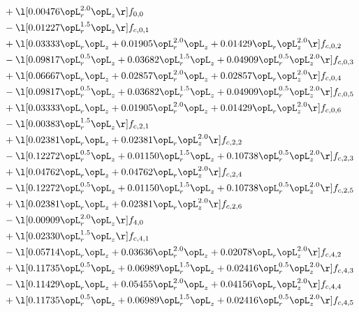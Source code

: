 \begin{alignat}{2}
& + \l[  0.00476 \opL_r^{2.0} \opL_z  \r] f_{0,0} \nonumber \\ 
& - \l[  0.01227 \opL_r^{1.5} \opL_z  \r] f_{c,0,1} \nonumber \\ 
& + \l[  0.03333 \opL_r \opL_z +  0.01905 \opL_r^{2.0} \opL_z +  0.01429 \opL_r \opL_z^{2.0}  \r] f_{c,0,2} \nonumber \\ 
& - \l[  0.09817 \opL_r^{0.5} \opL_z +  0.03682 \opL_r^{1.5} \opL_z +  0.04909 \opL_r^{0.5} \opL_z^{2.0}  \r] f_{c,0,3} \nonumber \\ 
& + \l[  0.06667 \opL_r \opL_z +  0.02857 \opL_r^{2.0} \opL_z +  0.02857 \opL_r \opL_z^{2.0}  \r] f_{c,0,4} \nonumber \\ 
& - \l[  0.09817 \opL_r^{0.5} \opL_z +  0.03682 \opL_r^{1.5} \opL_z +  0.04909 \opL_r^{0.5} \opL_z^{2.0}  \r] f_{c,0,5} \nonumber \\ 
& + \l[  0.03333 \opL_r \opL_z +  0.01905 \opL_r^{2.0} \opL_z +  0.01429 \opL_r \opL_z^{2.0}  \r] f_{c,0,6} \nonumber \\ 
& - \l[  0.00383 \opL_r^{1.5} \opL_z  \r] f_{c,2,1} \nonumber \\ 
& + \l[  0.02381 \opL_r \opL_z +  0.02381 \opL_r \opL_z^{2.0}  \r] f_{c,2,2} \nonumber \\ 
& - \l[  0.12272 \opL_r^{0.5} \opL_z +  0.01150 \opL_r^{1.5} \opL_z +  0.10738 \opL_r^{0.5} \opL_z^{2.0}  \r] f_{c,2,3} \nonumber \\ 
& + \l[  0.04762 \opL_r \opL_z +  0.04762 \opL_r \opL_z^{2.0}  \r] f_{c,2,4} \nonumber \\ 
& - \l[  0.12272 \opL_r^{0.5} \opL_z +  0.01150 \opL_r^{1.5} \opL_z +  0.10738 \opL_r^{0.5} \opL_z^{2.0}  \r] f_{c,2,5} \nonumber \\ 
& + \l[  0.02381 \opL_r \opL_z +  0.02381 \opL_r \opL_z^{2.0}  \r] f_{c,2,6} \nonumber \\ 
& - \l[  0.00909 \opL_r^{2.0} \opL_z  \r] f_{4,0} \nonumber \\ 
& + \l[  0.02330 \opL_r^{1.5} \opL_z  \r] f_{c,4,1} \nonumber \\ 
& - \l[  0.05714 \opL_r \opL_z +  0.03636 \opL_r^{2.0} \opL_z +  0.02078 \opL_r \opL_z^{2.0}  \r] f_{c,4,2} \nonumber \\ 
& + \l[  0.11735 \opL_r^{0.5} \opL_z +  0.06989 \opL_r^{1.5} \opL_z +  0.02416 \opL_r^{0.5} \opL_z^{2.0}  \r] f_{c,4,3} \nonumber \\ 
& - \l[  0.11429 \opL_r \opL_z +  0.05455 \opL_r^{2.0} \opL_z +  0.04156 \opL_r \opL_z^{2.0}  \r] f_{c,4,4} \nonumber \\ 
& + \l[  0.11735 \opL_r^{0.5} \opL_z +  0.06989 \opL_r^{1.5} \opL_z +  0.02416 \opL_r^{0.5} \opL_z^{2.0}  \r] f_{c,4,5} \nonumber \\ 

\end{alignat}

